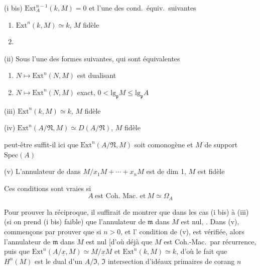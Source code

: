 \documentclass[11pt,a4paper]{article}
\begin{document}
(i bis) $\mathrm{Ext}^{n-1}_A(k, M) = 0$ et l'une des 
cond.\ équiv.\ suivantes
\begin{enumerate}
  \item[$*$e)] $\mathrm{Ext}^n(k, M) \simeq k$, $M$ fidèle
  \item[\struck{$*$f)}] 
\end{enumerate}

(ii) Sous l'une des formes suivantes, qui sont équivalentes
\begin{enumerate}
  \item[a)] $N \mapsto \mathrm{Ext}^n(N, M)$ est dualisant
  \item[b)] $N \mapsto \mathrm{Ext}^n(N, M)$ exact,
    $0 < \mathrm{lg}_{\mathfrak{p}} M \leq \mathrm{lg}_{\mathfrak{p}} A$
\end{enumerate}

(iii) $\mathrm{Ext}^n(k, M) \simeq k$, $M$ fidèle
\struck{\ill{}}

(iv) $\mathrm{Ext}^n(A/\mathfrak{N}, M) \simeq D(A/\mathfrak{N})$,
$M$ fidèle \struck{\ill{}}

peut-être suffit-il ici que $\mathrm{Ext}^n(A/\mathfrak{N}, M)$ soit
comonogène et $M$ de support $\mathrm{Spec}(A)$


(v) L'annulateur de  dans $M/x_1M + \cdots + x_nM$
est de dim 1, $M$ est fidèle

Ces conditions sont vraies si
\[
  \boxed{A \ \text{est Coh.\ Mac.\ et} \ M \simeq \Omega_A}
\]

Pour prouver la réciproque, il suffirait de montrer que dans les cas
 (i bis) à (iii) (si on prend (i bis) faible) que
 l'annulateur de $\mathfrak{m}$ dans $M$ est nul,
. Dans (v),
 commençons par prouver que si
$n > 0$, et  l' condition de (v),
est vérifiée, alors l'annulateur de $\mathfrak{m}$ dans $M$ est nul [d'où
déjà que $M$ est Coh.-Mac.\ par récurrence, puis que
$\mathrm{Ext}^n(A/\underline{x}, M) \simeq M/\underline{x}M$ et
$\mathrm{Ext}^n(k, M) \simeq k$, d'où le fait que $H^n(M)$ est le dual d'un
$A/\mathfrak{I}$, $\mathfrak{I}$ intersection d'idéaux primaires de
corang $n$
\end{document}
